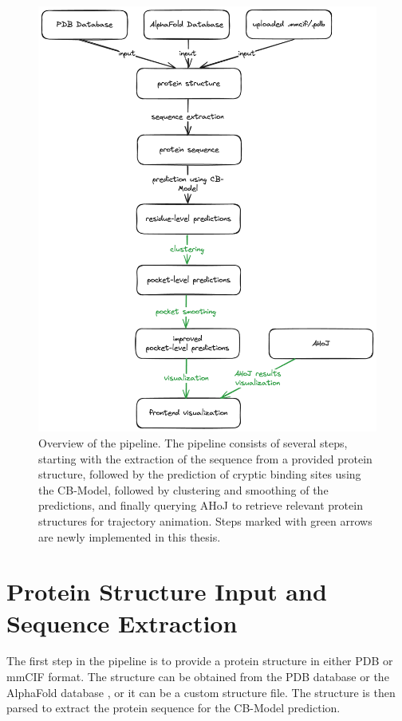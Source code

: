 \begin{figure}[htbp]
    \centering
    \includegraphics[width=\textwidth]{img/methodology-overview.png}
    \caption{Overview of the pipeline. The pipeline consists of several steps, starting with the extraction of the sequence from a provided protein structure, followed by the prediction of cryptic binding sites using the CB-Model, followed by clustering and smoothing of the predictions, and finally querying AHoJ to retrieve relevant protein structures for trajectory animation. Steps marked with green arrows are newly implemented in this thesis.}
    \label{fig:pipeline-overview}
\end{figure}

\section{Protein Structure Input and Sequence Extraction}
\label{sec:structure-input}

The first step in the pipeline is to provide a protein structure in either PDB or mmCIF format. The structure can be obtained from the PDB database \cite{berman2000protein} or the AlphaFold database \cite{jumper2021highly}, or it can be a custom structure file. The structure is then parsed to extract the protein sequence for the CB-Model prediction.

